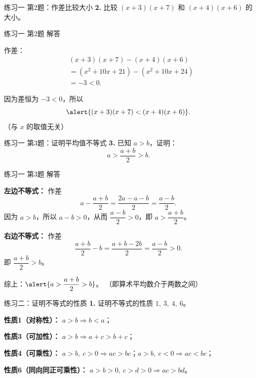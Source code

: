\documentclass[10pt,aspectratio=169,serif]{beamer}
\begin{document}
\begin{frame}[t]{练习一 第2题：作差比较大小}
\textbf{2.} 比较 $(x+3)(x+7)$ 和 $(x+4)(x+6)$ 的大小。
\end{frame}

\begin{frame}[t]{练习一 第2题 解答}
\begin{tcolorbox}[colback=orange!10,colframe=orange,title=\textbf{解：作差法}]
作差：
\begin{align*}
&(x+3)(x+7) - (x+4)(x+6)\\
&= (x^2 + 10x + 21) - (x^2 + 10x + 24)\\
&= -3 < 0.
\end{align*}

\vspace{0.5em}
因为差恒为 $-3 < 0$，所以
\[
\alert{(x+3)(x+7) < (x+4)(x+6)}.
\]
\small（与 $x$ 的取值无关）
\end{tcolorbox}
\end{frame}

\begin{frame}[t]{练习一 第3题：证明平均值不等式}
\textbf{3.} 已知 $a>b$，证明：
\[
a > \frac{a+b}{2} > b.
\]
\end{frame}

\begin{frame}[t]{练习一 第3题 解答}
\begin{tcolorbox}[colback=orange!10,colframe=orange,title=\textbf{证明}]
\textbf{左边不等式：} 作差
\[
a - \frac{a+b}{2} = \frac{2a - a - b}{2} = \frac{a-b}{2}.
\]
因为 $a>b$，所以 $a-b>0$，从而 $\dfrac{a-b}{2}>0$，即 $a>\dfrac{a+b}{2}$。

\vspace{0.5em}
\textbf{右边不等式：} 作差
\[
\frac{a+b}{2} - b = \frac{a+b - 2b}{2} = \frac{a-b}{2} > 0.
\]
即 $\dfrac{a+b}{2} > b$。

\vspace{0.5em}
综上：$\alert{a > \dfrac{a+b}{2} > b}$。
\small（即算术平均数介于两数之间）
\end{tcolorbox}
\end{frame}

\begin{frame}[t]{练习二：证明不等式的性质}
\textbf{1.} 证明不等式的性质 $1,\ 3,\ 4,\ 6$。

\vspace{0.8em}
\small
\textbf{性质1（对称性）：} $a>b \Rightarrow b<a$；

\textbf{性质3（可加性）：} $a>b \Rightarrow a+c>b+c$；

\textbf{性质4（可乘性）：} $a>b,\ c>0 \Rightarrow ac>bc$；\quad $a>b,\ c<0 \Rightarrow ac<bc$；

\textbf{性质6（同向同正可乘性）：} $a>b>0,\ c>d>0 \Rightarrow ac>bd$。
\end{frame}
\end{document}

